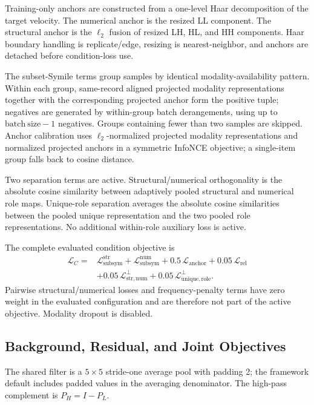 \documentclass[11pt]{article}
\begin{document}
Training-only anchors are constructed from a one-level Haar decomposition of the target velocity. The numerical anchor is the resized LL component. The structural anchor is the $\ell_2$ fusion of resized LH, HL, and HH components. Haar boundary handling is replicate/edge, resizing is nearest-neighbor, and anchors are detached before condition-loss use.

The subset-Symile terms group samples by identical modality-availability pattern. Within each group, same-record aligned projected modality representations together with the corresponding projected anchor form the positive tuple; negatives are generated by within-group batch derangements, using up to $\mathrm{batch\ size}-1$ negatives. Groups containing fewer than two samples are skipped. Anchor calibration uses $\ell_2$-normalized projected modality representations and normalized projected anchors in a symmetric InfoNCE objective; a single-item group falls back to cosine distance.

Two separation terms are active. Structural/numerical orthogonality is the absolute cosine similarity between adaptively pooled structural and numerical role maps. Unique-role separation averages the absolute cosine similarities between the pooled unique representation and the two pooled role representations. No additional within-role auxiliary loss is active.

The complete evaluated condition objective is
\begin{equation}
\begin{split}
\mathcal L_C={}&
\mathcal L_{\mathrm{subsym}}^{\mathrm{str}}
+\mathcal L_{\mathrm{subsym}}^{\mathrm{num}}
+0.5\,\mathcal L_{\mathrm{anchor}}
+0.05\,\mathcal L_{\mathrm{rel}}\\
&+0.05\,\mathcal L_{\mathrm{str,num}}^{\perp}
+0.05\,\mathcal L_{\mathrm{unique,role}}^{\perp}.
\end{split}
\end{equation}
Pairwise structural/numerical losses and frequency-penalty terms have zero weight in the evaluated configuration and are therefore not part of the active objective. Modality dropout is disabled.

\subsection{Background, Residual, and Joint Objectives}

The shared filter is a $5\times5$ stride-one average pool with padding 2; the framework default includes padded values in the averaging denominator. The high-pass complement is $P_H=I-P_L$.
\end{document}
